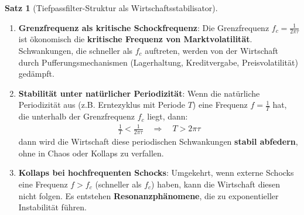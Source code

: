\documentclass[a4paper,12pt,twoside]{report}
\theoremstyle{definition}
\newtheorem{satz}{Satz}
\begin{document}
\begin{satz}[Tiefpassfilter-Struktur als Wirtschaftsstabilisator]
\begin{enumerate}
\item \textbf{Grenzfrequenz als kritische Schockfrequenz}: Die Grenzfrequenz $f_c = \frac{1}{2\pi \tau}$ ist ökonomisch die \textbf{kritische Frequenz von Marktvolatilität}. Schwankungen, die schneller als $f_c$ auftreten, werden von der Wirtschaft durch Pufferungsmechanismen (Lagerhaltung, Kreditvergabe, Preisvolatilität) gedämpft.

\item \textbf{Stabilität unter natürlicher Periodizität}: Wenn die natürliche Periodizität aus \cite{epp_signal} (z.B. Erntezyklus mit Periode $T$) eine Frequenz $f = \frac{1}{T}$ hat, die unterhalb der Grenzfrequenz $f_c$ liegt, dann:
\begin{align}
\frac{1}{T} < \frac{1}{2\pi \tau} \quad \Rightarrow \quad T > 2\pi \tau
\end{align}
dann wird die Wirtschaft diese periodischen Schwankungen \textbf{stabil abfedern}, ohne in Chaos oder Kollaps zu verfallen.

\item \textbf{Kollaps bei hochfrequenten Schocks}: Umgekehrt, wenn externe Schocks eine Frequenz $f > f_c$ (schneller als $f_c$) haben, kann die Wirtschaft diesen nicht folgen. Es entstehen \textbf{Resonanzphänomene}, die zu exponentieller Instabilität führen.

\end{enumerate}

\end{satz}
\end{document}
